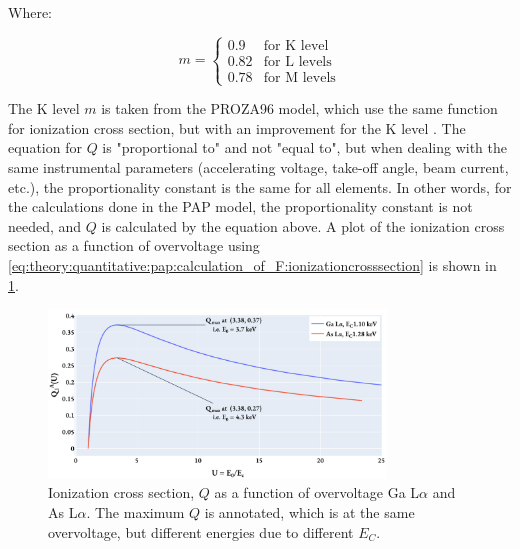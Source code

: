 Where:

\begin{equation}
    \label{eq:theory:quantitative:pap:calculation_of_F:ionizationcrosssection:m}
    m = \begin{cases}
        0.9  & \text{for K level}  \\
        0.82 & \text{for L levels} \\
        0.78 & \text{for M levels}
    \end{cases}
\end{equation}

The K level $m$ is taken from the PROZA96 model, which use the same function for ionization cross section, but with an improvement for the K level \cite{bastin_proza96_1998}.
The equation for $Q$ is "proportional to" and not "equal to", but when dealing with the same instrumental parameters (accelerating voltage, take-off angle, beam current, etc.), the proportionality constant is the same for all elements.
In other words, for the calculations done in the PAP model, the proportionality constant is not needed, and $Q$ is calculated by the equation above.
A plot of the ionization cross section as a function of overvoltage using \cref{eq:theory:quantitative:pap:calculation_of_F:ionizationcrosssection} is shown in \cref{fig:PAP:ionization_cross_section}.



\begin{figure}[htbp]
    \centering
    \includegraphics[width=0.8\textwidth]{figures/PAP_ionization_cross_section.pdf}
    \caption{
        Ionization cross section, $Q$ as a function of overvoltage Ga L$\alpha$ and As L$\alpha$.
        The maximum $Q$ is annotated, which is at the same overvoltage, but different energies due to different $E_C$.
    }
    \label{fig:PAP:ionization_cross_section}
\end{figure}



